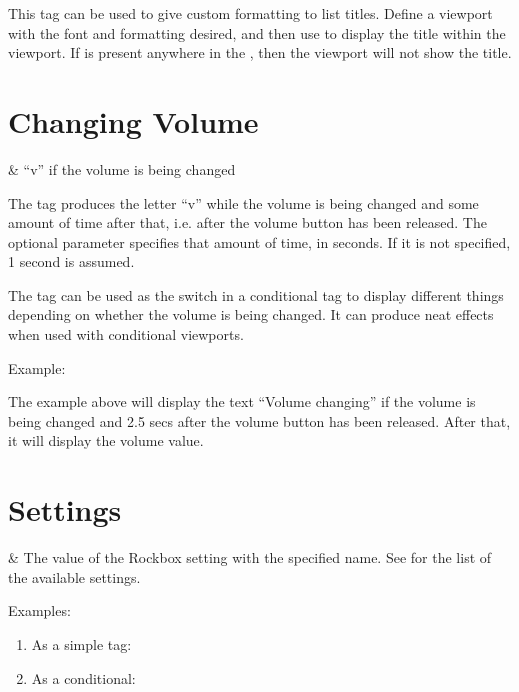   This tag can be used to give custom formatting to list titles.
  Define a viewport with the font and formatting desired, and then use
   to display the title within the
  viewport.  If  is present anywhere in the , then the
   viewport will not show the title.

\section{Changing Volume}
  \begin{tagmap}
     & ``v'' if the volume is being changed\\
  \end{tagmap}

The tag produces the letter ``v'' while the volume is being changed and some
amount of time after that, i.e. after the volume button has been released. The
optional parameter  specifies that amount of time, in seconds. If it
is not specified, 1 second is assumed.

The tag can be used as the switch in a conditional tag to display different things
depending on whether the volume is being changed. It can produce neat effects
when used with conditional viewports.

Example: 

The example above will display the text ``Volume changing'' if the volume is
being changed and 2.5 secs after the volume button has been released. After
that, it will display the volume value.

\section{Settings}
  \begin{tagmap}
     & The value of the Rockbox
             setting with the specified name. See 
             for the list of the available settings.\\
  \end{tagmap}

Examples:
\begin{enumerate}
\item As a simple tag: 
\item As a conditional: 
\end{enumerate}


